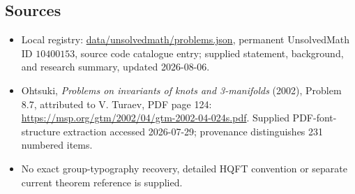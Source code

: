 \documentclass[11pt]{article}
\begin{document}
\subsection{Sources}
\begin{itemize}
\item Local registry: \url{data/unsolvedmath/problems.json}, permanent UnsolvedMath ID \(10400153\), source code catalogue entry; supplied statement, background, and research summary, updated 2026-08-06.
\item Ohtsuki, \emph{Problems on invariants of knots and 3-manifolds} (2002), Problem 8.7, attributed to V. Turaev, PDF page 124: \url{https://msp.org/gtm/2002/04/gtm-2002-04-024s.pdf}. Supplied PDF-font-structure extraction accessed 2026-07-29; provenance distinguishes 231 numbered items.
\item No exact group-typography recovery, detailed HQFT convention or separate current theorem reference is supplied.
\end{itemize}
\end{document}
